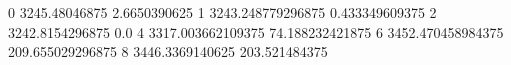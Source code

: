 0 3245.48046875 2.6650390625
1 3243.248779296875 0.433349609375
2 3242.8154296875 0.0
4 3317.003662109375 74.188232421875
6 3452.470458984375 209.655029296875
8 3446.3369140625 203.521484375

